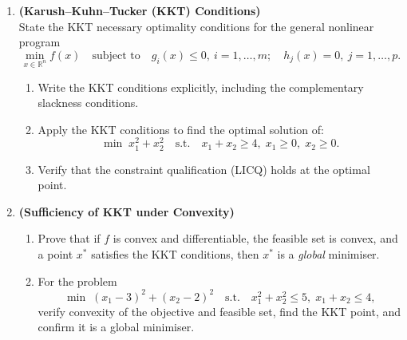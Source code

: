 \documentclass[12pt,a4paper]{article}
\begin{document}
\begin{enumerate}[leftmargin=*, label=\textbf{Q.\arabic*.}]
\item \textbf{(Karush--Kuhn--Tucker (KKT) Conditions)}\\
  State the KKT necessary optimality conditions for the general nonlinear
  program
  \[
    \min_{x \in \mathbb{R}^n} f(x) \quad \text{subject to} \quad
    g_i(x) \le 0,\ i = 1,\ldots,m;\quad h_j(x) = 0,\ j = 1,\ldots,p.
  \]
  \begin{enumerate}[label=(\alph*)]
    \item Write the KKT conditions explicitly, including the complementary
          slackness conditions.
    \item Apply the KKT conditions to find the optimal solution of:
          \[
            \min\; x_1^2 + x_2^2 \quad \text{s.t.} \quad
            x_1 + x_2 \ge 4,\; x_1 \ge 0,\; x_2 \ge 0.
          \]
    \item Verify that the constraint qualification (LICQ) holds at the
          optimal point.
  \end{enumerate}

\item \textbf{(Sufficiency of KKT under Convexity)}\\
  \begin{enumerate}[label=(\alph*)]
    \item Prove that if $f$ is convex and differentiable, the feasible set is
          convex, and a point $x^*$ satisfies the KKT conditions, then $x^*$
          is a \emph{global} minimiser.
    \item For the problem
          \[
            \min\; (x_1-3)^2 + (x_2-2)^2 \quad \text{s.t.} \quad
            x_1^2 + x_2^2 \le 5,\; x_1 + x_2 \le 4,
          \]
          verify convexity of the objective and feasible set, find the KKT
          point, and confirm it is a global minimiser.
  \end{enumerate}


\end{enumerate}
\end{document}
